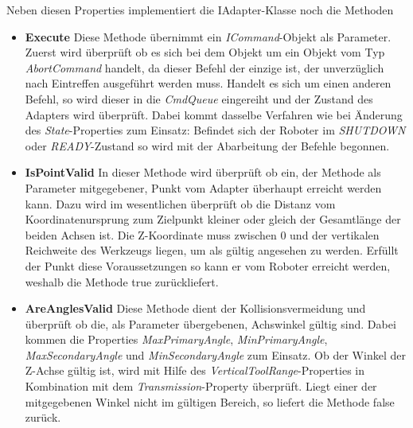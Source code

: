 Neben diesen Properties implementiert die IAdapter-Klasse noch die Methoden
\begin{itemize}
\item \textbf{Execute}
\newline
Diese Methode übernimmt ein \textit{ICommand}-Objekt als Parameter. Zuerst wird überprüft ob es sich bei dem Objekt um ein Objekt vom Typ \textit{AbortCommand} handelt, da dieser Befehl der einzige ist, der unverzüglich nach Eintreffen ausgeführt werden muss. Handelt es sich um einen anderen Befehl, so wird dieser in die \textit{CmdQueue} eingereiht und der Zustand des Adapters wird überprüft. Dabei kommt dasselbe Verfahren wie bei Änderung des \textit{State}-Properties zum Einsatz: Befindet sich der Roboter im \textit{SHUTDOWN} oder \textit{READY}-Zustand so wird mit der Abarbeitung der Befehle begonnen.
\item \textbf{IsPointValid}
\newline
In dieser Methode wird überprüft ob ein, der Methode als Parameter mitgegebener, Punkt vom Adapter überhaupt erreicht werden kann. Dazu wird im wesentlichen überprüft ob die Distanz vom Koordinatenursprung zum Zielpunkt kleiner oder gleich der Gesamtlänge der beiden Achsen ist. Die Z-Koordinate muss zwischen 0 und der vertikalen Reichweite des Werkzeugs liegen, um als gültig angesehen zu werden. Erfüllt der Punkt diese Voraussetzungen so kann er vom Roboter erreicht werden, weshalb die Methode true zurückliefert.
\item \textbf{AreAnglesValid}
\newline
Diese Methode dient der Kollisionsvermeidung und überprüft ob die, als Parameter übergebenen, Achswinkel gültig sind. Dabei kommen die Properties \textit{MaxPrimaryAngle}, \textit{MinPrimaryAngle}, \textit{MaxSecondaryAngle} und \textit{MinSecondaryAngle} zum Einsatz. Ob der Winkel der Z-Achse gültig ist, wird mit Hilfe des \textit{VerticalToolRange}-Properties in Kombination mit dem \textit{Transmission}-Property überprüft. Liegt einer der mitgegebenen Winkel nicht im gültigen Bereich, so liefert die Methode false zurück.
\end{itemize}

